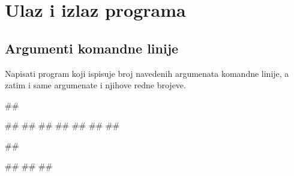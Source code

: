 \chapter{Ulaz i izlaz programa}

\section{Argumenti komandne linije}
 
\begin{Exercise}[label=v2.2_04] 
    Napisati program koji ispisuje broj navedenih argumenata komandne linije,
    a zatim i same argumenate i njihove redne brojeve.
    
\begin{miditest}
\begin{upotreba}{1}
##

#\naslovIzlaz#
##
##
##
##
##
##
\end{upotreba}
\end{miditest}
\begin{miditest}
\begin{upotreba}{2}
##

#\naslovIzlaz#
##
##
\end{upotreba}
\end{miditest}

\end{Exercise}
\ifresenja
\begin{Answer}[ref=v2.2_04]
\end{Answer}
 \fi


